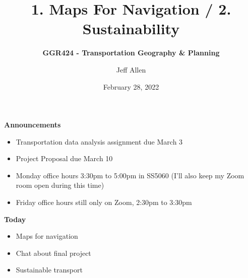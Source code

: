 \documentclass[aspectratio=169]{beamer}
\title{\textbf{1. Maps For Navigation / 2. Sustainability}}
\subtitle{\textbf{GGR424 - Transportation Geography \& Planning}}
\author{Jeff Allen}
\institute{University of Toronto}
\date{February 28, 2022}
\begin{document}
	
\begin{frame}
	\titlepage	
\end{frame}





\begin{frame}
	
	\textbf{Announcements}
	
	\begin{itemize}
		\item Transportation data analysis assignment due March 3
		\item Project Proposal due March 10
		\item Monday office hours 3:30pm to 5:00pm in SS5060 (I'll also keep my Zoom room open during this time)
		\item Friday office hours still only on Zoom, 2:30pm to 3:30pm
	\end{itemize}
	
\end{frame}





\begin{frame}
	
	\textbf{Today}
	
	\begin{itemize}
		\item Maps for navigation
		\item Chat about final project
		\item Sustainable transport
	\end{itemize}
	
\end{frame}
\end{document}
